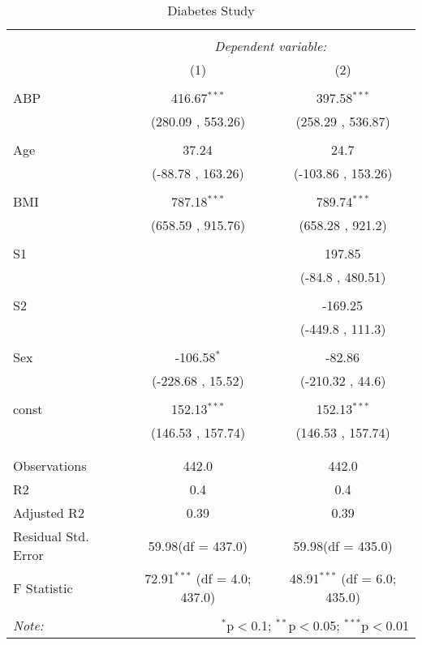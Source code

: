 \documentclass[12pt]{article}
\numberwithin{equation}{subsection}
\begin{document}
\begin{table}[!htbp] \centering
  \caption{Diabetes Study}
  \label{}
\begin{tabular}{@{\extracolsep{5pt}}lcc}
\\[-1.8ex]\hline
\hline \\[-1.8ex]
& \multicolumn{2}{c}{\textit{Dependent variable:}} \
\cr \cline{2-3}
\\[-1.8ex] & (1) & (2) \\
\hline \\[-1.8ex]
 ABP & 416.67$^{***}$ & 397.58$^{***}$ \\
  & (280.09 , 553.26) & (258.29 , 536.87) \\
  & & \\
 Age & 37.24$^{}$ & 24.7$^{}$ \\
  & (-88.78 , 163.26) & (-103.86 , 153.26) \\
  & & \\
 BMI & 787.18$^{***}$ & 789.74$^{***}$ \\
  & (658.59 , 915.76) & (658.28 , 921.2) \\
  & & \\
 S1 & & 197.85$^{}$ \\
  & & (-84.8 , 480.51) \\
  & & \\
 S2 & & -169.25$^{}$ \\
  & & (-449.8 , 111.3) \\
  & & \\
 Sex & -106.58$^{*}$ & -82.86$^{}$ \\
  & (-228.68 , 15.52) & (-210.32 , 44.6) \\
  & & \\
 const & 152.13$^{***}$ & 152.13$^{***}$ \\
  & (146.53 , 157.74) & (146.53 , 157.74) \\
  & & \\
\hline \\[-1.8ex]
 Observations & 442.0 & 442.0 \\
 R${2}$ & 0.4 & 0.4 \\
 Adjusted R${2}$ & 0.39 & 0.39 \\
 Residual Std. Error & 59.98(df = 437.0) & 59.98(df = 435.0)  \\
 F Statistic & 72.91$^{***}$ (df = 4.0; 437.0) & 48.91$^{***}$ (df = 6.0; 435.0) \\
\hline
\hline \\[-1.8ex]
\textit{Note:} & \multicolumn{2}{r}{$^{*}$p$<$0.1; $^{**}$p$<$0.05; $^{***}$p$<$0.01} \\
\end{tabular}
\end{table}
\end{document}
